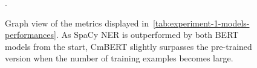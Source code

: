 \begin{figure}[ht!]
	  \caption{\label{fig:f1-vs-trainsize} Graph view of the metrics displayed in~\cref{tab:experiment-1-models-performances}. As SpaCy NER is outperformed by both BERT models from the start, CmBERT slightly surpasses the pre-trained version when the number of training examples becomes large.}.
\end{figure}
	                                        

